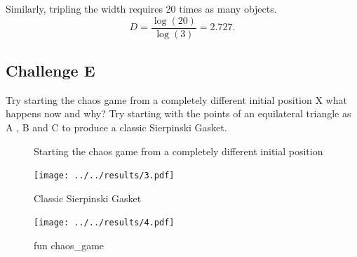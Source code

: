 \documentclass[12pt]{article}
\begin{document}
Similarly, tripling the width requires 20 times as many objects. $$D = \frac{\log(20)}{\log(3)} = 2.727.$$

\newpage
\subsection{Challenge E}
Try starting the chaos game from a completely different initial position X what happens now and why? Try starting with the points of an equilateral triangle as A , B and C to produce a classic Sierpinski Gasket.


\begin{figure}[htbp] 
\centering 
{}%
\centering 
\caption{Starting the chaos game from a completely different initial position}

\begin{minipage}[t]{0.48\textwidth}
\centering
\texttt{[image: ../../results/3.pdf]}
\caption{Classic Sierpinski Gasket}
\end{minipage}
\begin{minipage}[t]{0.48\textwidth}
\centering
\texttt{[image: ../../results/4.pdf]}
\caption{fun chaos\_game}
\end{minipage}

\end{figure}
\end{document}
